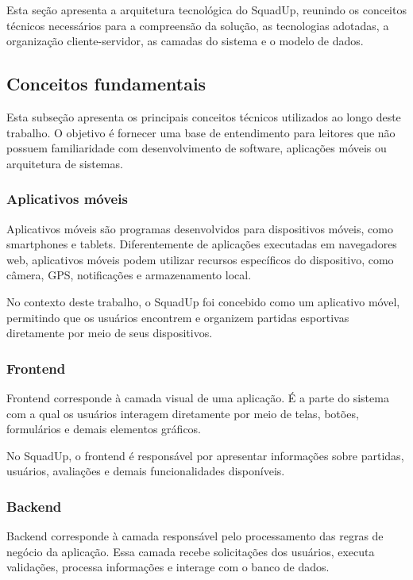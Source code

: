 \documentclass[a4paper, 12pt]{article}
\begin{document}
\begin{justify}
Esta seção apresenta a arquitetura tecnológica do SquadUp, reunindo os conceitos técnicos necessários para a compreensão da solução, as tecnologias adotadas, a organização cliente-servidor, as camadas do sistema e o modelo de dados.

\subsection{Conceitos fundamentais}

Esta subseção apresenta os principais conceitos técnicos utilizados ao longo deste trabalho. O objetivo é fornecer uma base de entendimento para leitores que não possuem familiaridade com desenvolvimento de software, aplicações móveis ou arquitetura de sistemas.

\subsubsection{Aplicativos móveis}

Aplicativos móveis são programas desenvolvidos para dispositivos móveis, como smart\-phones e tablets. Diferentemente de aplicações executadas em navegadores web, aplicativos móveis podem utilizar recursos específicos do dispositivo, como câmera, GPS, notificações e armazenamento local.

No contexto deste trabalho, o SquadUp foi concebido como um aplicativo móvel, permitindo que os usuários encontrem e organizem partidas esportivas diretamente por meio de seus dispositivos.

\subsubsection{Frontend}

Frontend corresponde à camada visual de uma aplicação. É a parte do sistema com a qual os usuários interagem diretamente por meio de telas, botões, formulários e demais elementos gráficos.

No SquadUp, o frontend é responsável por apresentar informações sobre partidas, usuários, avaliações e demais funcionalidades disponíveis.

\subsubsection{Backend}

Backend corresponde à camada responsável pelo processamento das regras de negócio da aplicação. Essa camada recebe solicitações dos usuários, executa validações, processa informações e interage com o banco de dados.


\end{justify}
\end{document}
